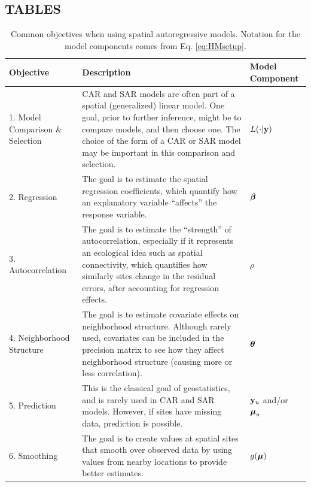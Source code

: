 \documentclass[11pt, titlepage]{article}\usepackage[]{graphicx}\usepackage[]{color}
\begin{document}
\begin{spacing}{1.9}
\begin{flushleft}
\newpage


\section*{TABLES}
\begin{table}[ht]
	\caption{Common objectives when using spatial autoregressive models. Notation for the model components comes from Eq. \ref{eq:HMsetup}. \label{Tab:ARobj}}
\begin{center}
{\footnotesize
\begin{tabular}{|p{1.1in}|p{3.7in}|p{0.8in}|}
	\hline
	Objective & Description & Model Component \\
	\hline
	\hline
	1. Model Comparison \& Selection & CAR and SAR models are often part of a spatial (generalized) linear model. One goal, prior to further inference, might be to compare models, and then choose one. The choice of the form of a CAR or SAR model may be important in this comparison and selection. & $L(\cdot|\mathbf{y})$ \\
  \hline
	2. Regression & The goal is to estimate the spatial regression coefficients, which quantify how an explanatory variable ``affects'' the response variable.  & $\mbox{\boldmath $\beta$}$ \\
	\hline
	3. Autocorrelation & The goal is to estimate the ``strength'' of autocorrelation, especially if it represents an ecological idea such as spatial connectivity, which quantifies how similarly sites change in the residual errors, after accounting for regression effects.  & $\rho$ \\
	\hline
	4. Neighborhood Structure & The goal is to estimate covariate effects on neighborhood structure. Although rarely used, covariates can be included in the precision matrix to see how they affect neighborhood structure (causing more or less correlation). & $\mbox{\boldmath $\theta$}$ \\
	\hline
	5. Prediction & This is the classical goal of geostatistics, and is rarely used in CAR and SAR models. However, if sites have missing data, prediction is possible.  & $\mathbf{y}_u$ and/or $\mbox{\boldmath $\mu$}_u$ \\
	\hline
	6. Smoothing  & The goal is to create values at spatial sites that smooth over observed data by using values from nearby locations to provide better estimates. & $g(\mbox{\boldmath $\mu$})$ \\
	\hline
\end{tabular}
}
\end{center}
\end{table}


\end{flushleft}
\end{spacing}
\end{document}

